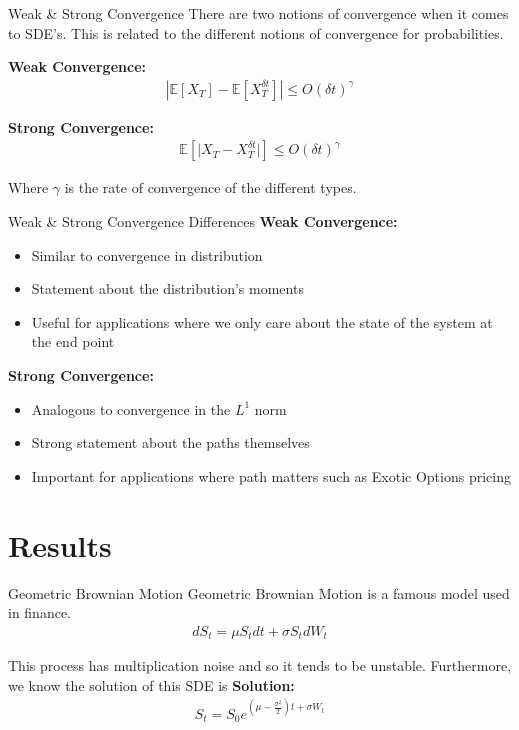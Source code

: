 \documentclass[]{beamer}
\begin{document}
\begin{frame}{Weak \& Strong Convergence}
There are two notions of convergence when it comes to SDE's. This is related to the different notions of convergence for probabilities.
\newline

\textbf{Weak Convergence:}
\begin{gather*}
  \left\lvert \mathbb{E} \left[ X_T \right] - \mathbb{E} \left[ X_T^{\delta t} \right] \right\lvert \leq O(\delta t)^\gamma
\end{gather*}

\textbf{Strong Convergence:}
\begin{gather*}
  \mathbb{E} \left[ \lvert X_T - X_T^{\delta t} \rvert \right] \leq O(\delta t)^\gamma
\end{gather*}

Where $\gamma$ is the rate of convergence of the different types.

\end{frame}

\begin{frame}{Weak \& Strong Convergence Differences}
\textbf{Weak Convergence:}
\begin{itemize}
  \item Similar to convergence in distribution
  \item Statement about the distribution's moments
  \item Useful for applications where we only care about the state of the system at the end point
\end{itemize}

\textbf{Strong Convergence:}
\begin{itemize}
  \item Analogous to convergence in the $L^1$ norm
  \item Strong statement about the paths themselves
  \item Important for applications where path matters such as Exotic Options pricing
\end{itemize}

\end{frame}

\section{Results}

\begin{frame}{Geometric Brownian Motion}
Geometric Brownian Motion is a famous model used in finance.
\begin{gather*}
    d S_t = \mu S_t dt + \sigma S_t d W_t
  \end{gather*}

  This process has multiplication noise and so it tends to be unstable. Furthermore, we know the solution of this SDE is
  \newline
  \textbf{Solution:}
  \begin{gather*}
    S_t = S_0 e^{(\mu - \frac{\sigma^2}{2})t + \sigma W_t}
  \end{gather*}
\end{frame}
\end{document}
